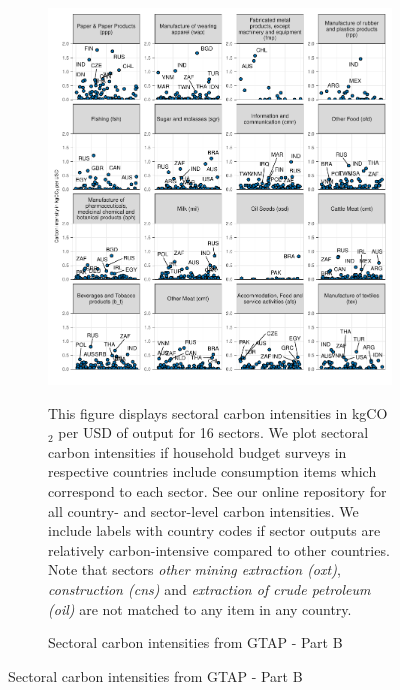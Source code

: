 \clearpage

\begin{figure}[ht!]\ContinuedFloat
\begin{subfigure}[b]{\textwidth}
  \centering
  \includegraphics{Analysis_Carbon_Intensities_GTAP/Figure_2.1.1_B_2017B.pdf}
  \caption{Sectoral carbon intensities from GTAP - Part B} \label{fig:B2}  
  \begin{subcaption2}
    This figure displays sectoral carbon intensities in kgCO$_{2}$ per USD of output for 16 sectors. We plot sectoral carbon intensities if household budget surveys in respective countries include consumption items which correspond to each sector. See our online repository for all country- and sector-level carbon intensities. We include labels with country codes if sector outputs are relatively carbon-intensive compared to other countries. Note that sectors \textit{other mining extraction (oxt)}, \textit{construction (cns)} and \textit{extraction of crude petroleum (oil)} are not matched to any item in any country.
  \end{subcaption2}
\end{subfigure}
\end{figure}

\clearpage

